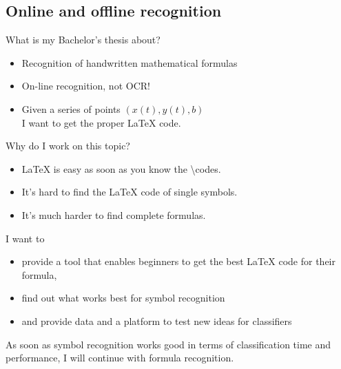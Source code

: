 \subsection{Online and offline recognition}

\begin{frame}{What is my Bachelor's thesis about?}
    \begin{itemize}
        \item Recognition of handwritten mathematical formulas
        \item On-line recognition, not OCR!
        \item Given a series of points $(x(t), y(t), b)$\\
              I want to get the proper \LaTeX{} code.
    \end{itemize}
\end{frame}

\begin{frame}{Why do I work on this topic?}
    \begin{itemize}
        \item \LaTeX{} is easy as soon as you know the \textbackslash{}codes.
        \item It's hard to find the \LaTeX{} code of single symbols.
        \item It's much harder to find complete formulas.
    \end{itemize}

    I want to
    \begin{itemize}
        \item provide a tool that enables beginners to get the best \LaTeX{} code
              for their formula,
        \item find out what works best for symbol recognition
        \item and provide data and a platform to test new ideas for classifiers
    \end{itemize}

    As soon as symbol recognition works good in terms of classification time and
    performance, I will continue with formula recognition.
\end{frame}